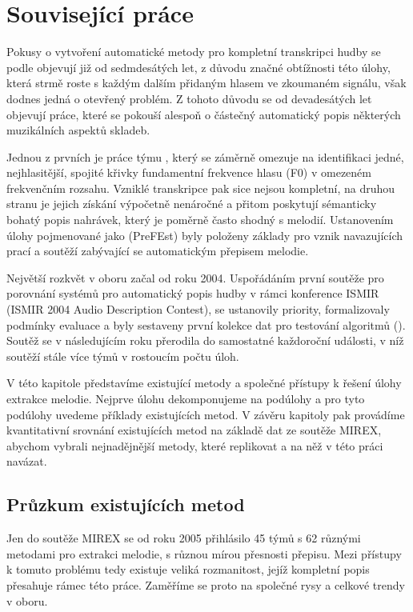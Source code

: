 \chapter{Související práce}\label{cha:souvisejici}

Pokusy o vytvoření automatické metody pro kompletní transkripci hudby se podle \cite{Poliner2007} objevují již od sedmdesátých let, z důvodu značné obtížnosti této úlohy, která strmě roste s každým dalším přidaným hlasem ve zkoumaném signálu, však dodnes jedná o otevřený problém. Z tohoto důvodu se od devadesátých let objevují práce, které se pokouší alespoň o částečný automatický popis některých muzikálních aspektů skladeb.

Jednou z prvních je práce týmu \cite{Goto1999}, který se záměrně omezuje na identifikaci jedné, nejhlasitější, spojité křivky fundamentní frekvence hlasu (F0) v omezeném frekvenčním rozsahu. Vzniklé transkripce pak sice nejsou kompletní, na druhou stranu je jejich získání výpočetně nenáročné a přitom poskytují sémanticky bohatý popis nahrávek, který je poměrně často shodný s melodií. Ustanovením úlohy pojmenované jako  (PreFEst) byly položeny základy pro vznik navazujících prací a soutěží zabývající se automatickým přepisem melodie.

Největší rozkvět v oboru začal od roku 2004. Uspořádáním první soutěže pro porovnání systémů pro automatický popis hudby v rámci konference ISMIR (ISMIR 2004 Audio Description Contest), se ustanovily priority, formalizovaly podmínky evaluace a byly sestaveny první kolekce dat pro testování algoritmů (\cite{Downie2010}). Soutěž se v následujícím roku přerodila do samostatné každoroční události, v níž soutěží stále více týmů v rostoucím počtu úloh. 

V této kapitole představíme existující metody a společné přístupy k řešení úlohy extrakce melodie. Nejprve úlohu dekomponujeme na podúlohy a pro tyto podúlohy uvedeme příklady existujících metod. V závěru kapitoly pak provádíme kvantitativní srovnání existujících metod na základě dat ze soutěže MIREX, abychom vybrali nejnadějnější metody, které replikovat a na něž v této práci navázat.

\section{Průzkum existujících metod}

Jen do soutěže MIREX se od roku 2005 přihlásilo 45 týmů s 62 různými metodami pro extrakci melodie, s různou mírou přesnosti přepisu. Mezi přístupy k tomuto problému tedy existuje veliká rozmanitost, jejíž kompletní popis přesahuje rámec této práce. Zaměříme se proto na společné rysy a celkové trendy v oboru. 

